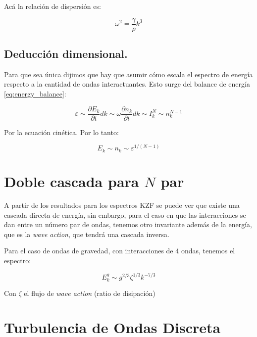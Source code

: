 Acá la relación de dispersión es:

\begin{equation}
	\omega^2 = \frac{\gamma}{\rho}k^3
\end{equation}


\subsection*{Deducción dimensional.}
Para que sea única dijimos que hay que asumir cómo escala el espectro de energía respecto a la cantidad de ondas interactuantes. Esto surge del balance de energía \eqref{eq:energy_balance}:

\begin{equation}
	\varepsilon \sim \frac{\partial E_k}{\partial t} dk \sim \omega \frac{\partial n_k}{\partial t} dk \sim I_k^N \sim n_k^{N-1}
\end{equation}

Por la ecuación cinética. Por lo tanto: \cite{deikeEtudesExperimentalesNumeriques2013}

\begin{equation}
	E_k \sim n_k \sim \varepsilon^{1/(N-1)}
\end{equation}



\section{Doble cascada para $N$ par} %
A partir de los resultados para los espectros KZF se puede ver que existe una cascada directa de energía, sin embargo, para el caso en que las interacciones se dan entre un número par de ondas, tenemos otro invariante además de la energía, que es la \textit{wave action}, que tendrá una cascada inversa. \cite{nazarenkoWaveTurbulence2011}

Para el caso de ondas de gravedad, con interacciones de 4 ondas, tenemos el espectro:

\begin{equation}
	E^g_k \sim g^{2/3} \zeta^{1/3} k^{-7/3}
\end{equation}

Con $\zeta$ el flujo de \textit{wave action} (ratio de disipación)



\section{Turbulencia de Ondas Discreta}




















